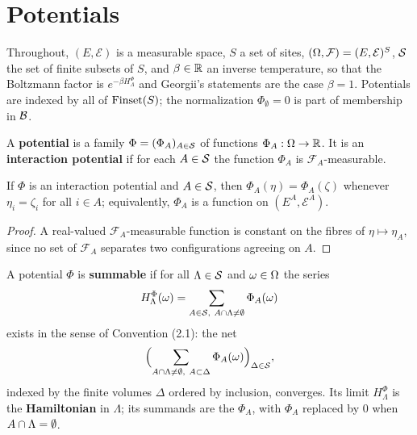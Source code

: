 \section{Potentials}

Throughout, $(E, \mathcal{E})$ is a measurable space, $S$ a set of sites,
$(\Omega, \mathcal{F}) = (E, \mathcal{E})^S$, $\mathcal{S}$ the set of finite subsets of $S$, and
$\beta \in \mathbb{R}$ an inverse temperature, so that the Boltzmann factor is
$e^{-\beta H^\Phi_\Lambda}$ and Georgii's statements are the case $\beta = 1$. Potentials are
indexed by all of $\operatorname{Finset}(S)$; the normalization $\Phi_\emptyset = 0$ is part of membership in
$\mathcal{B}$.

\begin{definition}
    \label{def:pot-potential}
    \leanok

    A \textbf{potential} is a family $\Phi = (\Phi_A)_{A \in \mathcal{S}}$ of functions
    $\Phi_A : \Omega \to \mathbb{R}$. It is an \textbf{interaction potential} if for each $A \in \mathcal{S}$
    the function $\Phi_A$ is $\mathcal{F}_A$-measurable.
\end{definition}

\begin{lemma}
    \label{lem:pot-depends-on}
    \leanok

    If $\Phi$ is an interaction potential and $A \in \mathcal{S}$, then $\Phi_A(\eta) = \Phi_A(\zeta)$
    whenever $\eta_i = \zeta_i$ for all $i \in A$; equivalently, $\Phi_A$ is a function on
    $(E^A, \mathcal{E}^A)$.
\end{lemma}
\begin{proof}
    \leanok

    A real-valued $\mathcal{F}_A$-measurable function is constant on the fibres of
    $\eta \mapsto \eta_A$, since no set of $\mathcal{F}_A$ separates two configurations
    agreeing on $A$.
\end{proof}

\begin{definition}
    \label{def:pot-hamiltonian}
    \leanok

    A potential $\Phi$ is \textbf{summable} if for all $\Lambda \in \mathcal{S}$ and $\omega \in \Omega$
    the series
    \[ H_\Lambda^\Phi(\omega) = \sum_{A \in \mathcal{S},\ A \cap \Lambda \neq \emptyset}
        \Phi_A(\omega) \]
    exists in the sense of Convention (2.1): the net
    \[ \Bigl( \sum_{A \cap \Lambda \neq \emptyset,\ A \subset \Delta} \Phi_A(\omega)
      \Bigr)_{\Delta \in \mathcal{S}} , \]
    indexed by the finite volumes $\Delta$ ordered by inclusion, converges. Its limit
    $H^\Phi_\Lambda$ is the \textbf{Hamiltonian} in $\Lambda$; its summands are the $\Phi_A$,
    with $\Phi_A$ replaced by $0$ when $A \cap \Lambda = \emptyset$.
\end{definition}

